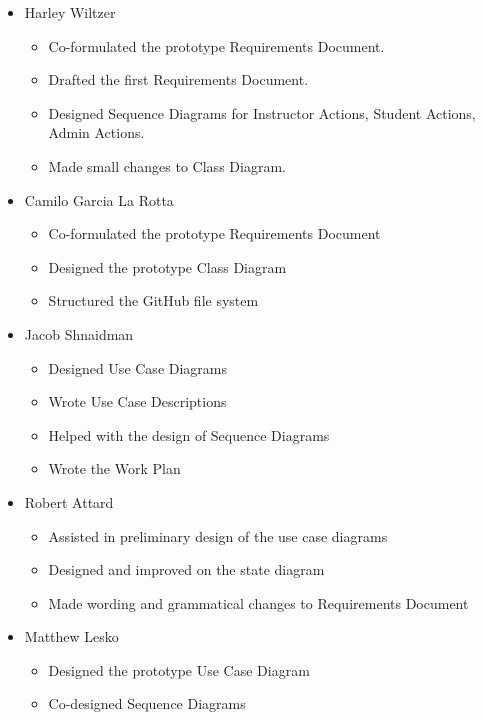 \documentclass[12pt]{article}
\begin{document}
\begin{itemize}
    \item Harley Wiltzer
    \begin{itemize}
        \item Co-formulated the prototype Requirements Document.
        \item Drafted the first Requirements Document.
        \item Designed Sequence Diagrams for Instructor Actions, Student Actions, Admin Actions.
        \item Made small changes to Class Diagram.
    \end{itemize}
    \item Camilo Garcia La Rotta
    \begin{itemize}
        \item Co-formulated the prototype Requirements Document
        \item Designed the prototype Class Diagram
        \item Structured the GitHub file system
    \end{itemize}
    \item Jacob Shnaidman
        \begin{itemize}
            \item Designed Use Case Diagrams
            \item Wrote Use Case Descriptions
            \item Helped with the design of Sequence Diagrams
            \item Wrote the Work Plan
        \end{itemize}
    \item Robert Attard
    \begin{itemize}
        \item Assisted in preliminary design of the use case diagrams
        \item Designed and improved on the state diagram
        \item Made wording and grammatical changes to Requirements Document
    \end{itemize}
    \item Matthew Lesko
    \begin{itemize}
        \item Designed the prototype Use Case Diagram
        \item Co-designed Sequence Diagrams
    \end{itemize}
\end{itemize}
\end{document}
